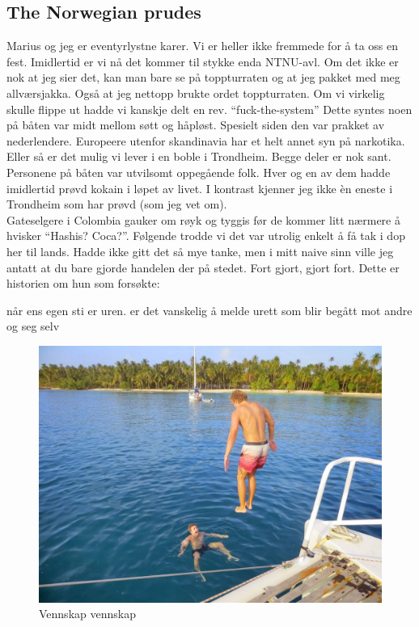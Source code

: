 \subsection*{The Norwegian prudes}

Marius og jeg er eventyrlystne karer. Vi er heller ikke fremmede for å
ta oss en fest. Imidlertid er vi nå det kommer til stykke enda
NTNU-avl. Om det ikke er nok at jeg sier det, kan man bare se på
toppturraten og at jeg pakket med meg allværsjakka. Også at jeg
nettopp brukte ordet toppturraten.
Om vi virkelig skulle flippe ut hadde vi kanskje delt en rev.
``fuck-the-system''
Dette syntes noen  på båten var midt mellom søtt og håpløst. Spesielt siden den var prakket av
nederlendere. Europeere utenfor skandinavia har et helt annet syn på narkotika. Eller så
er det mulig vi lever i en boble i Trondheim. Begge deler er nok sant.
Personene på båten var utvilsomt oppegående folk. Hver og en av dem
hadde imidlertid prøvd kokain i løpet av livet. I kontrast kjenner jeg
ikke èn eneste i Trondheim som har prøvd (som jeg vet om).\\

Gateselgere i Colombia gauker om røyk og tyggis før de kommer litt
nærmere å hvisker ``Hashis? Coca?''.  Følgende trodde vi det var
utrolig enkelt å få tak i dop her til lands. Hadde ikke gitt det så
mye tanke, men i mitt naive sinn ville jeg antatt at du bare gjorde
handelen der på stedet. Fort gjort, gjort fort. Dette er historien om
hun som forsøkte:

når ens egen sti er uren. 
er det vanskelig å melde urett som blir begått mot andre og seg selv
\begin{figure}[h]
	\centering
	\includegraphics[width=\textwidth]{vennskapvol2}
	\caption{Vennskap vennskap}
	\label{fig:vennskap}
\end{figure}


